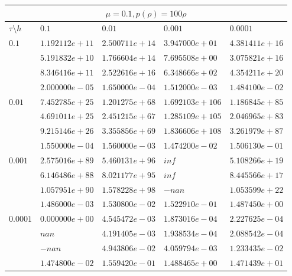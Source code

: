 \documentclass[12pt,a4paper]{article}
\begin{document}
\begin{tabular}{ |l|l|l|l|l| }
    \hline
    \multicolumn{5}{|c|}{$\mu = 0.1, p(\rho)  = 100\rho$}\\
    \hline
    $\tau\setminus h$ & $0.1$ & $0.01$ & $0.001$ & $0.0001$\\
    \hline
    $0.1$ & $1.192112e+11$ & $2.500711e+14$ & $3.947000e+01$ & $4.381411e+16$ \\
    & $5.191832e+10$ & $1.766604e+14$ & $7.695508e+00$ & $3.075821e+16$ \\
    & $8.346416e+11$ & $2.522616e+16$ & $6.348666e+02$ & $4.354211e+20$ \\
    & $2.000000e-05$ & $1.650000e-04$ & $1.512000e-03$ & $1.484100e-02$ \\
    \hline
    $0.01$ & $7.452785e+25$ & $1.201275e+68$ & $1.692103e+106$ & $1.186845e+85$ \\
    & $4.691011e+25$ & $2.451215e+67$ & $1.285109e+105$ & $2.046965e+83$ \\
    & $9.215146e+26$ & $3.355856e+69$ & $1.836606e+108$ & $3.261979e+87$ \\
    & $1.550000e-04$ & $1.560000e-03$ & $1.474200e-02$ & $1.506130e-01$ \\
    \hline
    $0.001$ & $2.575016e+89$ & $5.460131e+96$ & $inf$ & $5.108266e+19$ \\
    & $6.146486e+88$ & $8.021177e+95$ & $inf$ & $8.445566e+17$ \\
    & $1.057951e+90$ & $1.578228e+98$ & $-nan$ & $1.053599e+22$ \\
    & $1.486000e-03$ & $1.530800e-02$ & $1.522910e-01$ & $1.487450e+00$ \\
    \hline
    $0.0001$ & $0.000000e+00$ & $4.545472e-03$ & $1.873016e-04$ & $2.227625e-04$ \\
    & $nan$ & $4.191405e-03$ & $1.938534e-04$ & $2.088542e-04$ \\
    & $-nan$ & $4.943806e-02$ & $4.059794e-03$ & $1.233435e-02$ \\
    & $1.474800e-02$ & $1.559420e-01$ & $1.488465e+00$ & $1.471439e+01$ \\
    \hline
\end{tabular}
\end{document}
